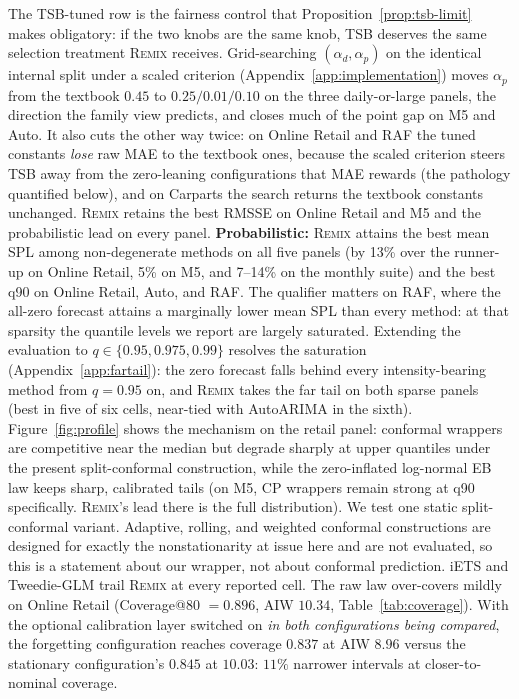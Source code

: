 \documentclass[twocolumn,10pt]{article}
\newcommand{\REMIX}{\textsc{Remix}}
\begin{document}
The TSB-tuned row is the fairness control that
Proposition~\ref{prop:tsb-limit} makes obligatory: if the two knobs are
the same knob, TSB deserves the same selection treatment \REMIX{}
receives. Grid-searching $(\alpha_d,\alpha_p)$ on the identical internal
split under a scaled criterion (Appendix~\ref{app:implementation}) moves
$\alpha_p$ from the textbook $0.45$ to $0.25/0.01/0.10$ on the three
daily-or-large panels, the direction the family view predicts, and
closes much of the point gap on M5 and Auto. It also cuts the other way
twice: on Online Retail and RAF the tuned constants \emph{lose} raw MAE
to the textbook ones, because the scaled criterion steers TSB away from
the zero-leaning configurations that MAE rewards (the pathology
quantified below), and on Carparts the search returns the textbook
constants unchanged. \REMIX{} retains the best RMSSE on Online Retail
and M5 and the probabilistic lead on every panel. \textbf{Probabilistic:} \REMIX{} attains the best mean SPL among
non-degenerate methods on all five panels (by 13\% over the runner-up on
Online Retail, 5\% on M5, and 7--14\% on the monthly suite) and the best
q90 on Online Retail, Auto, and RAF. The qualifier matters on RAF, where
the all-zero forecast attains a marginally lower mean SPL than every
method: at that sparsity the quantile levels we report are largely
saturated. Extending the evaluation to $q\in\{0.95,0.975,0.99\}$
resolves the saturation (Appendix~\ref{app:fartail}): the zero forecast
falls behind every intensity-bearing method from $q{=}0.95$ on, and
\REMIX{} takes the far tail on both sparse panels (best in five of six
cells, near-tied with AutoARIMA in the sixth). Figure~\ref{fig:profile}
shows the mechanism on the retail panel: conformal wrappers are
competitive near the median but degrade sharply at upper quantiles under
the present split-conformal construction, while the zero-inflated
log-normal EB law keeps sharp, calibrated tails (on M5, CP wrappers
remain strong at q90 specifically. \REMIX{}'s lead there is the full
distribution). We test one static split-conformal variant. Adaptive,
rolling, and weighted conformal constructions are designed for exactly
the nonstationarity at issue here and are not evaluated, so this is a
statement about our wrapper, not about conformal prediction. iETS and
Tweedie-GLM trail \REMIX{} at every reported cell. The raw law over-covers
mildly on Online Retail (Coverage@80 $=0.896$, AIW $10.34$,
Table~\ref{tab:coverage}). With the optional calibration layer switched
on \emph{in both configurations being compared}, the forgetting
configuration reaches coverage $0.837$ at AIW $8.96$ versus the
stationary configuration's $0.845$ at $10.03$: $11\%$ narrower
intervals at closer-to-nominal coverage.
\end{document}
